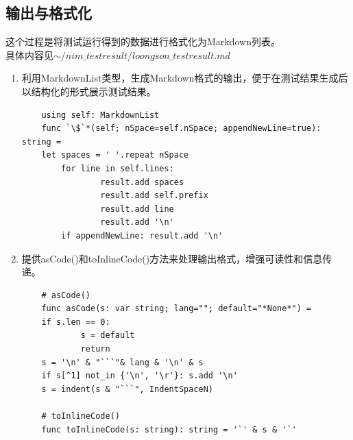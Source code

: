 \documentclass[UTF8]{ctexart}
\begin{document}
	\subsection{输出与格式化} %
	这个过程是将测试运行得到的数据进行格式化为Markdown列表。\\ 具体内容见\href{run:../loongson_testresult.md}{$ \sim/nim\_testresult/loongson\_testresult.md $} %
	\begin{enumerate}[leftmargin=3.5em]
		\item 利用MarkdownList类型，生成Markdown格式的输出，便于在测试结果生成后以结构化的形式展示测试结果。
		\begin{tcolorbox}[colback=gray!20, colframe=gray!20, rounded corners, boxrule=-5pt, height=0.2\textheight, width=0.83\textwidth, left=0pt, right=0pt, top=0pt, bottom=0pt]
			\begin{verbatim}
	using self: MarkdownList
	func `\$`*(self; nSpace=self.nSpace; appendNewLine=true): string =
 	let spaces = ' '.repeat nSpace
  		for line in self.lines:
    			result.add spaces
    			result.add self.prefix
    			result.add line
    			result.add '\n'
  		if appendNewLine: result.add '\n'
			\end{verbatim}
		\end{tcolorbox}
		\item 提供asCode()和toInlineCode()方法来处理输出格式，增强可读性和信息传递。
		\begin{tcolorbox}[colback=gray!20, colframe=gray!20, rounded corners, boxrule=-5pt, height=0.25\textheight, width=0.7\textwidth, left=0pt, right=0pt, top=0pt, bottom=0pt]
			\begin{verbatim}
	# asCode()
	func asCode(s: var string; lang=""; default="*None*") =
  	if s.len == 0:
    		s = default
    		return
  	s = '\n' & "```"& lang & '\n' & s
  	if s[^1] not_in {'\n', '\r'}: s.add '\n'
  	s = indent(s & "```", IndentSpaceN)
			
	# toInlineCode()
	func toInlineCode(s: string): string = '`' & s & '`'
			\end{verbatim}
		\end{tcolorbox}
	\end{enumerate}
\end{document}
